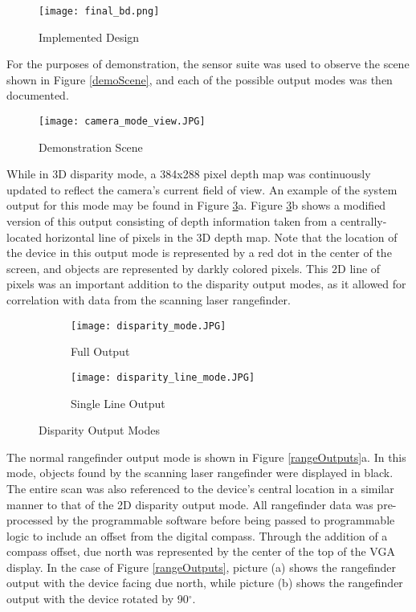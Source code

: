 \begin{figure}[H] 
	\centerline{
	\texttt{[image: final\_bd.png]}
	}
	\caption{Implemented Design}
	\label{finalBD}
\end{figure}
\par
For the purposes of demonstration, the sensor suite was used to observe the scene shown in Figure \ref{demoScene}, and each of the possible output modes was then documented.
\par
\begin{figure}[H]  
 	\centerline{
	\texttt{[image: camera\_mode\_view.JPG]}
	}
	\caption{Demonstration Scene}
	\label{camOutMode}
\end{figure}  
\par
While in 3D disparity mode, a 384x288 pixel depth map was continuously updated to reflect the camera's current field of view. An example of the system output for this mode may be found in Figure \ref{disparityOutputs}a. Figure \ref{disparityOutputs}b shows a modified version of this output consisting of depth information taken from a centrally-located horizontal line of pixels in the 3D depth map. Note that the location of the device in this output mode is represented by a red dot in the center of the screen, and objects are represented by darkly colored pixels. This 2D line of pixels was an important addition to the disparity output modes, as it allowed for correlation with data from the scanning laser rangefinder. 

\begin{figure}[H] 
         \begin{subfigure}[h]{0.5\textwidth}
              \centerline{\texttt{[image: disparity\_mode.JPG]}}
             \caption{Full Output}
         \end{subfigure}
         \begin{subfigure}[h]{0.5\textwidth}
             \centerline{\texttt{[image: disparity\_line\_mode.JPG]}}
             \caption{Single Line Output}
         \end{subfigure}
\caption{Disparity Output Modes}
\label{disparityOutputs}
\end{figure}

The normal rangefinder output mode is shown in Figure \ref{rangeOutputs}a. In this mode, objects found by the scanning laser rangefinder were displayed in black. The entire scan was also referenced to the device's central location in a similar manner to that of the 2D disparity output mode. All rangefinder data was pre-processed by the programmable software before being passed to programmable logic to include an offset from the digital compass.  Through the addition of a compass offset, due north was represented by the center of the top of the VGA display. In the case of Figure \ref{rangeOutputs}, picture (a) shows the rangefinder output with the device facing due north, while picture (b) shows the rangefinder output with the device rotated by 90$^\circ$.
\par 


